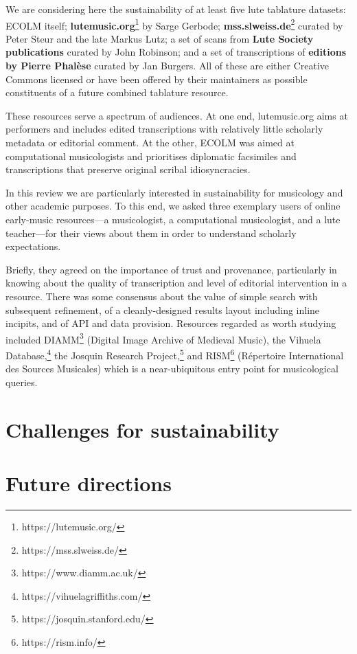\documentclass[sigconf]{acmart}
\begin{document}
\begin{sloppypar}
  We are considering here the sustainability of at least five lute
  tablature datasets: ECOLM itself; {\bf
    lutemusic.org}\footnote{https://lutemusic.org/} by Sarge Gerbode;
  {\bf mss.slweiss.de}\footnote{https://mss.slweiss.de/} curated by
  Peter Steur and the late Markus Lutz; a set of scans from {\bf Lute
    Society publications} curated by John Robinson; and a set of
  transcriptions of {\bf editions by Pierre Phal\`ese} curated by Jan
  Burgers. All of these are either Creative Commons licensed or have
  been offered by their maintainers as possible constituents of a
  future combined tablature resource.

  These resources serve a spectrum of audiences. At one end,
  lutemusic.org aims at performers and includes edited transcriptions
  with relatively little scholarly metadata or editorial comment. At
  the other, ECOLM was aimed at computational musicologists and
  prioritises diplomatic facsimiles and transcriptions that preserve
  original scribal idiosyncracies.

  In this review we are particularly interested in sustainability for
  musicology and other academic purposes. To this end, we asked three
  exemplary users of online early-music resources---a musicologist, a
  computational musicologist, and a lute teacher---for their views
  about them in order to understand scholarly expectations.

  Briefly, they agreed on the importance of trust and provenance,
  particularly in knowing about the quality of transcription and level
  of editorial intervention in a resource. There was some consensus
  about the value of simple search with subsequent refinement, of a
  cleanly-designed results layout including inline incipits, and of
  API and data provision. Resources regarded as worth studying
  included DIAMM\footnote{https://www.diamm.ac.uk/} (Digital Image
  Archive of Medieval Music), the Vihuela
  Database,\footnote{https://vihuelagriffiths.com/} the Josquin
  Research Project,\footnote{https://josquin.stanford.edu/} and
  RISM\footnote{https://rism.info/} (R\'epertoire International des
  Sources Musicales) which is a near-ubiquitous entry point for
  musicological queries.
  
  \section{Challenges for sustainability}\label{challenges}

  \section{Future directions}


\end{sloppypar}
\end{document}
